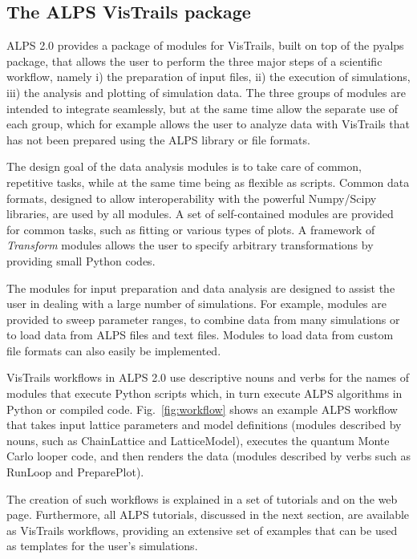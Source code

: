 \documentclass[12pt]{iopart}
\begin{document}
\subsection{The ALPS VisTrails package}

ALPS 2.0 provides a package of modules for VisTrails, built on top of the pyalps package, that allows the user to perform the three major steps of a scientific workflow, namely i) the preparation of input files, ii) the execution of simulations, iii) the analysis and plotting of simulation data. The three groups of modules are intended to integrate seamlessly, but at the same time allow the separate use of each group, which for example allows the user to analyze data with VisTrails that has not been prepared using the ALPS library or file formats.

The design goal of the data analysis modules is to take care of common, repetitive tasks, while at the same time being as flexible as scripts. Common data formats, designed to allow interoperability with the powerful Numpy/Scipy libraries, are used by all modules. A set of self-contained modules are provided for common tasks, such as fitting or various types of plots. A framework of {\it Transform} modules allows the user to specify arbitrary transformations by providing small Python codes.

The modules for input preparation and data analysis are designed to assist the user in dealing with a large number of simulations. For example, modules are provided to sweep parameter ranges, to combine data from many simulations or to load data from ALPS files and text files. Modules to load data from custom file formats can also easily be implemented.

VisTrails workflows in ALPS 2.0 use descriptive nouns and verbs for the names of modules that execute
 Python scripts which, in turn execute ALPS
algorithms in Python or compiled code. Fig.~\ref{fig:workflow} shows an example ALPS workflow
that takes input lattice parameters and model definitions (modules described by nouns, such as 
 ChainLattice and LatticeModel), executes the quantum
Monte Carlo looper code, and then renders the data (modules described by verbs such as RunLoop and PreparePlot).

The creation of such workflows is explained in a set of tutorials and on the web page. Furthermore, all ALPS tutorials, discussed in the next section, are available as VisTrails workflows, providing an extensive set of examples that can be used as templates for the user's simulations. 
\end{document}
